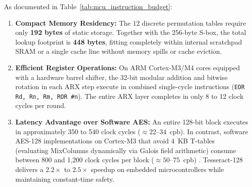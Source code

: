 \documentclass[10pt,twocolumn]{article}
\begin{document}
\begin{table}[htbp]
\caption{Assembly instruction budget and estimated clock cycle consumption per round of Tesseract-128 on 32-bit embedded architectures (ARM Thumb-2 Cortex-M3/M4 and RISC-V RV32I).}
\label{tab:mcu_instruction_budget}
\centering
\small
{}
\end{table}

As documented in Table~\ref{tab:mcu_instruction_budget}:
\begin{enumerate}
    \item \textbf{Compact Memory Residency:} The 12 discrete permutation tables require only \textbf{192 bytes} of static storage. Together with the 256-byte S-box, the total lookup footprint is \textbf{448 bytes}, fitting completely within internal scratchpad SRAM or a single cache line without memory spills or cache eviction.
    \item \textbf{Efficient Register Operations:} On ARM Cortex-M3/M4 cores equipped with a hardware barrel shifter, the 32-bit modular addition and bitwise rotation in each ARX step execute in combined single-cycle instructions (\texttt{EOR Rd, Rn, Rm, ROR \#n}). The entire ARX layer completes in only 8 to 12 clock cycles per round.
    \item \textbf{Latency Advantage over Software AES:} An entire 128-bit block executes in approximately 350 to 540 clock cycles ($\approx 22$--$34$~cpb). In contrast, software AES-128 implementations on Cortex-M3 that avoid 4~KB T-tables (evaluating MixColumns dynamically via Galois field arithmetic) consume between 800 and 1,200 clock cycles per block ($\approx 50$--$75$~cpb) \cite{kaartinen2009comparative}. Tesseract-128 delivers a $2.2\times$ to $2.5\times$ speedup on embedded microcontrollers while maintaining constant-time safety.
\end{enumerate}
\end{document}
